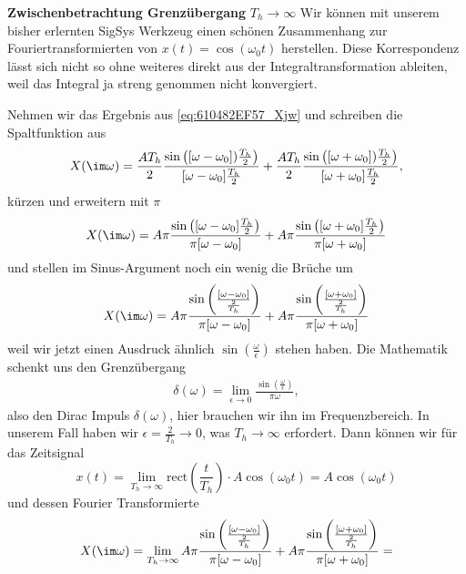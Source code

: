 \begin{mdframed}
\textbf{Zwischenbetrachtung Grenzübergang} $T_h\to\infty$ Wir können mit
unserem bisher erlernten SigSys Werkzeug
einen schönen Zusammenhang zur Fouriertransformierten von $x(t)=\cos(\omega_0 t)$
herstellen.
Diese Korrespondenz lässt sich nicht so ohne weiteres direkt aus der Integraltransformation
ableiten, weil das Integral ja streng genommen nicht konvergiert.
%

Nehmen wir das Ergebnis aus \ref{eq:610482EF57_Xjw} und schreiben die Spaltfunktion
aus
\begin{align}
X(\im \omega) =
\frac{A T_h}{2} \frac{\sin\left([\omega-\omega_0]) \frac{T_h}{2}\right)}{[\omega-\omega_0] \frac{T_h}{2}} +
\frac{A T_h}{2} \frac{\sin\left([\omega+\omega_0]) \frac{T_h}{2}\right)}{[\omega+\omega_0] \frac{T_h}{2}},
\end{align}
kürzen und erweitern mit $\pi$
\begin{align}
X(\im \omega) =
A \pi \frac{\sin\left([\omega-\omega_0] \frac{T_h}{2}\right)}{\pi [\omega-\omega_0]} +
A \pi \frac{\sin\left([\omega+\omega_0] \frac{T_h}{2}\right)}{\pi [\omega+\omega_0]}
\end{align}
und stellen im Sinus-Argument noch ein wenig die Brüche um
\begin{align}
X(\im \omega) =
A \pi \frac{\sin\left( \frac{[\omega-\omega_0]}{\frac{2}{T_h}}  \right)}{\pi [\omega-\omega_0]} +
A \pi \frac{\sin\left( \frac{[\omega+\omega_0]}{\frac{2}{T_h}}  \right)}{\pi [\omega+\omega_0]}
\end{align}
weil wir jetzt einen Ausdruck ähnlich $\sin(\frac{\omega}{\epsilon})$ stehen haben.
%
Die Mathematik schenkt uns den Grenzübergang
\begin{align}
\delta(\omega) = \lim_{\epsilon\to 0} \frac{\sin(\frac{\omega}{\epsilon})}{\pi \omega},
\end{align}
also den Dirac Impuls $\delta(\omega)$, hier brauchen wir ihn im Frequenzbereich.
%
In unserem Fall haben wir $\epsilon=\frac{2}{T_h} \to 0$, was $T_h\to \infty$
erfordert.
Dann können wir für das Zeitsignal
\begin{equation}
x(t) = \lim_{T_h\to\infty} \mathrm{rect}(\frac{t}{T_h}) \cdot A \cos(\omega_0 t) =
A \cos(\omega_0 t)
\end{equation}
und dessen Fourier Transformierte
\begin{align}
X(\im \omega) =
\lim_{T_h\to\infty}
A \pi \frac{\sin\left( \frac{[\omega-\omega_0]}{\frac{2}{T_h}}  \right)}{\pi [\omega-\omega_0]} +
A \pi \frac{\sin\left( \frac{[\omega+\omega_0]}{\frac{2}{T_h}}  \right)}{\pi [\omega+\omega_0]} =

\end{align}
\end{mdframed}
